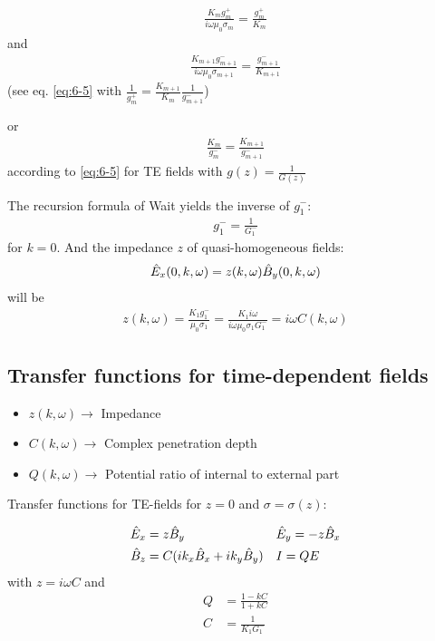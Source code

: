 \begin{align*}
\frac{K_mg_m^+}{i\omega\mu_0\sigma_m}=\frac{g_m^+}{K_m}
\end{align*}
and 
\begin{align*}
\frac{K_{m+1}g_{m+1}^-}{i\omega\mu_0\sigma_{m+1}}=\frac{g_{m+1}^-}{K_{m+1}}
\end{align*}
(see eq. \eqref{eq:6-5} with $\frac{1}{g_m^+}=\frac{K_{m+1}}{K_m}\frac{1}{g_{m+1}^-}$)

or
\begin{align*}
\frac{K_m}{g_m^-}=\frac{K_{m+1}}{g_{m+1}^-}
\end{align*}
according to \eqref{eq:6-5} for TE fields with $g(z)=\frac{1}{G(z)}$

The recursion formula of Wait yields the inverse of $g_1^-$:
\begin{align*}
g_1^-=\frac{1}{G_1^-}
\end{align*}
for $k=0$. And the impedance $z$ of quasi-homogeneous fields:
\begin{align*}
\hat{E}_x(0,k,\omega)=z(k,\omega)\hat{B}_y(0,k,\omega)
\end{align*}
will be
\begin{align*}
z(k,\omega)=\frac{K_1g_1^-}{\mu_0\sigma_1}=\frac{K_1i\omega}{i\omega\mu_0\sigma_1G_1^-}=i\omega C(k,\omega)
\end{align*}

\subsection{Transfer functions for time-dependent fields}

\begin{itemize}
\item $z(k,\omega)\rightarrow$ Impedance
\item $C(k,\omega)\rightarrow$ Complex penetration depth
\item $Q(k,\omega)\rightarrow$ Potential ratio of internal to external part
\end{itemize}
Transfer functions for TE-fields for $z=0$ and $\sigma=\sigma(z)$:

\begin{equation}
\begin{split}
\hat{E}_x&=z\hat{B}_y && \hat{E}_y=-z\hat{B}_x\\
\hat{B}_z&=C(ik_x\hat{B}_x+ik_y\hat{B}_y) && I=QE\\
\end{split}
\end{equation}
with $z=i\omega C$ and
\begin{equation}
\begin{split}
Q&=\frac{1-kC}{1+kC}\\
C&=\frac{1}{K_1G_1^-}
\end{split}
\end{equation}
